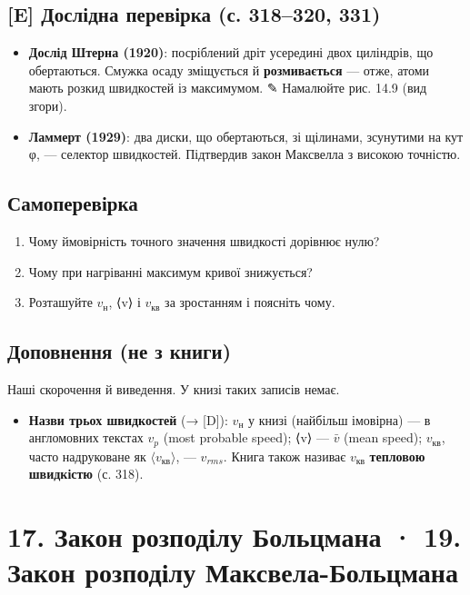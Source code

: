 \documentclass[11pt,a4paper,oneside]{book}
\newcommand{\pen}{{\sffamily\color{accent}✎}}
\begin{document}
\section*{[E] Дослідна перевірка (с. 318–320, 331)}
\begin{itemize}
\item \textbf{Дослід Штерна (1920)}: посріблений дріт усередині двох циліндрів, що обертаються. Смужка осаду зміщується й \textbf{розмивається} — отже, атоми мають розкид швидкостей із максимумом. \pen{} Намалюйте рис. 14.9 (вид згори).
\item \textbf{Ламмерт (1929)}: два диски, що обертаються, зі щілинами, зсунутими на кут φ, — селектор швидкостей. Підтвердив закон Максвелла з високою точністю.
\end{itemize}

\section*{Самоперевірка}
\begin{enumerate}
\item Чому ймовірність точного значення швидкості дорівнює нулю?
\item Чому при нагріванні максимум кривої знижується?
\item Розташуйте $v_{\text{н}}$, ⟨v⟩ і $v_{\text{кв}}$ за зростанням і поясніть чому.
\end{enumerate}

\section*{Доповнення (не з книги)}
Наші скорочення й виведення. У книзі таких записів немає.
\begin{itemize}
\item \textbf{Назви трьох швидкостей} (→ [D]): $v_\text{н}$ у книзі (найбільш імовірна) — в англомовних текстах $v_p$ (most probable speed); ⟨v⟩ — $\bar v$ (mean speed); $v_{\text{кв}}$, часто надруковане як $\langle v_{\text{кв}}\rangle$, — $v_{rms}$. Книга також називає $v_{\text{кв}}$ \textbf{тепловою швидкістю} (с. 318).
\end{itemize}

\chapter*{17. Закон розподілу Больцмана · 19. Закон розподілу Максвела-Больцмана}
\end{document}
